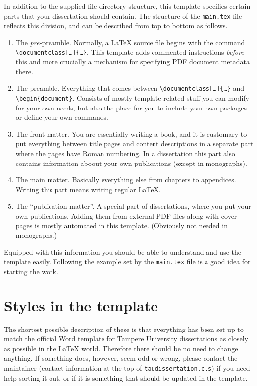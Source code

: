 In addition to the supplied file directory structure, this template specifies certain parts that your dissertation should contain. The structure of the \texttt{main.tex} file reflects this division, and can be described from top to bottom as follows.
\begin{enumerate}
\item The \emph{pre-}preamble. Normally, a \LaTeX{} source file begins with the command \texttt{\textbackslash documentclass[\ldots]\{\ldots\}}. This template adds commented instructions \emph{before} this and more crucially a mechanism for specifying PDF document metadata there.
\item The preamble. Everything that comes between \texttt{\textbackslash documentclass[\ldots]\{\ldots\}} and \texttt{\textbackslash begin\{document\}}. Consists of mostly template-related stuff you can modify for your own needs, but also the place for you to include your own packages or define your own commands.
\item The front matter. You are essentially writing a book, and it is customary to put everything between title pages and content descriptions in a separate part where the pages have Roman numbering. In a dissertation this part also contains information aboout your own publications (except in monographs).
\item The main matter. Basically everything else from chapters to appendices. Writing this part means writing regular \LaTeX.
\item The ``publication matter''. A special part of dissertations, where you put your own publications. Adding them from external PDF files along with cover pages is mostly automated in this template. (Obviously not needed in monographs.)
\end{enumerate}
Equipped with this information you should be able to understand and use the template easily. Following the example set by the \texttt{main.tex} file is a good idea for starting the work.

\section{Styles in the template}

The shortest possible description of these is that everything has been set up to match the official Word template for Tampere University dissertations as closely as possible in the \LaTeX{} world. Therefore there should be no need to change anything. If something does, however, seem odd or wrong, please contact the maintainer (contact information at the top of \texttt{taudissertation.cls}) if you need help sorting it out, or if it is something that should be updated in the template.

